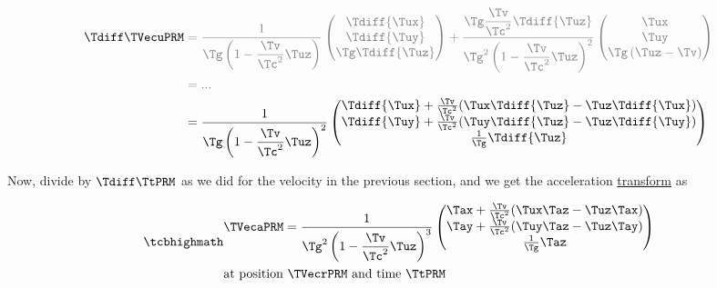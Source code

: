 \begin{equation}
	\begin{aligned}
		\Tdiff \TVecuPRM  & \color{gray} = \dfrac{1}{ {\Tg }\left(1-\dfrac{\Tv }{ \Tc ^2} {\Tuz }\right)}
		\begin{pmatrix}
			\Tdiff {\Tux }          \\
			\Tdiff {\Tuy }          \\
			{\Tg } \Tdiff {\Tuz } \\
		\end{pmatrix}
		+ \dfrac{ \Tg  \dfrac{\Tv }{ \Tc ^2} \Tdiff {\Tuz } }{ {\Tg }^2\left(1-\dfrac{\Tv }{ \Tc ^2} {\Tuz }\right)^2}
		\begin{pmatrix}
			{\Tux }                              \\
			{\Tuy }                              \\
			{\Tg } \left( {\Tuz }- \Tv  \right) \\
		\end{pmatrix}                                                          \\
		                  & \color{gray} = ...
		\\
		                  & = \dfrac{1}{ {\Tg }\left(1-\dfrac{\Tv }{ \Tc ^2} {\Tuz }\right)^2}
		\begin{pmatrix}
			\Tdiff {\Tux } + \frac{\Tv }{ \Tc ^2}( {\Tux } \Tdiff {\Tuz }-{\Tuz } \Tdiff {\Tux }) \\
			\Tdiff {\Tuy } + \frac{\Tv }{ \Tc ^2}( {\Tuy } \Tdiff {\Tuz }-{\Tuz } \Tdiff {\Tuy }) \\
			\frac{1}{ \Tg  } \Tdiff {\Tuz }                            \\
		\end{pmatrix}
	\end{aligned}
\end{equation}

Now, divide by ${\Tdiff \TtPRM  }$ as we did for the velocity in the previous section, and we get the acceleration \hyperlink{def-transform}{transform} as

\begin{equation}
	\mhl{
		\begin{aligned}
			 & \TVecaPRM  = \dfrac{1}{ {\Tg }^2\left(1-\dfrac{\Tv }{ \Tc ^2} {\Tuz }\right)^3}
			\begin{pmatrix}
				\Tax  + \frac{\Tv }{ \Tc ^2}({\Tux } {  \Taz  }-{\Tuz } {  \Tax  }) \\
				\Tay  + \frac{\Tv }{ \Tc ^2}({\Tuy } {  \Taz  }-{\Tuz } {  \Tay  }) \\
				\frac{1}{\Tg } \Taz
			\end{pmatrix}
			\\
			 & \text{at position ${\TVecrPRM  }$ and time $\TtPRM $}
		\end{aligned}
	}
	\label{eq: acceleration transform}
\end{equation}

